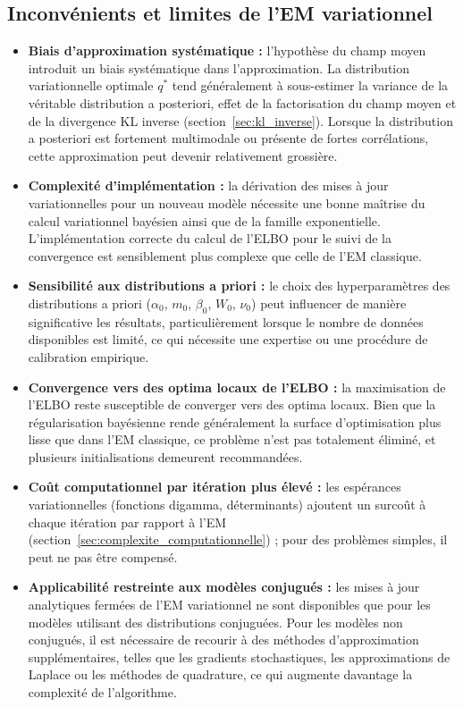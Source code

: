 \subsection{Inconvénients et limites de l'EM variationnel}\label{sec:limites_vb}
\begin{itemize}
\item \textbf{Biais d'approximation systématique : }l'hypothèse du champ moyen introduit un biais systématique dans l'approximation. La distribution variationnelle optimale $q^{*}$ tend généralement à sous-estimer la variance de la véritable distribution a posteriori, effet de la factorisation du champ moyen et de la divergence KL inverse (section~\ref{sec:kl_inverse}). Lorsque la distribution a posteriori est fortement multimodale ou présente de fortes corrélations, cette approximation peut devenir relativement grossière.
\item \textbf{Complexité d'implémentation : }la dérivation des mises à jour variationnelles pour un nouveau modèle nécessite une bonne maîtrise du calcul variationnel bayésien ainsi que de la famille exponentielle. L'implémentation correcte du calcul de l'ELBO pour le suivi de la convergence est sensiblement plus complexe que celle de l'EM classique.
\item \textbf{Sensibilité aux distributions a priori : }le choix des hyperparamètres des distributions a priori ($\alpha _{0}$, $m_{0}$, $\beta _{0}$, $W_{0}$, $\nu _{0}$) peut influencer de manière significative les résultats, particulièrement lorsque le nombre de données disponibles est limité, ce qui nécessite une expertise ou une procédure de calibration empirique.
\item \textbf{Convergence vers des optima locaux de l'ELBO : }la maximisation de l'ELBO reste susceptible de converger vers des optima locaux. Bien que la régularisation bayésienne rende généralement la surface d'optimisation plus lisse que dans l'EM classique, ce problème n'est pas totalement éliminé, et plusieurs initialisations demeurent recommandées.
\item \textbf{Coût computationnel par itération plus élevé : }les espérances variationnelles (fonctions digamma, déterminants) ajoutent un surcoût à chaque itération par rapport à l'EM (section~\ref{sec:complexite_computationnelle}) ; pour des problèmes simples, il peut ne pas être compensé.
\item \textbf{Applicabilité restreinte aux modèles conjugués : }les mises à jour analytiques fermées de l'EM variationnel ne sont disponibles que pour les modèles utilisant des distributions conjuguées. Pour les modèles non conjugués, il est nécessaire de recourir à des méthodes d'approximation supplémentaires, telles que les gradients stochastiques, les approximations de Laplace ou les méthodes de quadrature, ce qui augmente davantage la complexité de l'algorithme.

\end{itemize}
